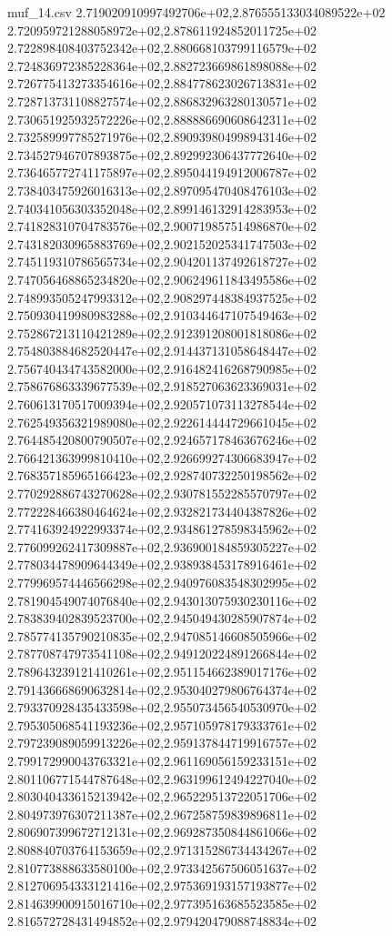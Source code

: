 \begin{filecontents*}{muf_14.csv}
2.719020910997492706e+02,2.876555133034089522e+02
2.720959721288058972e+02,2.878611924852011725e+02
2.722898408403752342e+02,2.880668103799116579e+02
2.724836972385228364e+02,2.882723669861898088e+02
2.726775413273354616e+02,2.884778623026713831e+02
2.728713731108827574e+02,2.886832963280130571e+02
2.730651925932572226e+02,2.888886690608642311e+02
2.732589997785271976e+02,2.890939804998943146e+02
2.734527946707893875e+02,2.892992306437772640e+02
2.736465772741175897e+02,2.895044194912006787e+02
2.738403475926016313e+02,2.897095470408476103e+02
2.740341056303352048e+02,2.899146132914283953e+02
2.741828310704783576e+02,2.900719857514986870e+02
2.743182030965883769e+02,2.902152025341747503e+02
2.745119310786565734e+02,2.904201137492618727e+02
2.747056468865234820e+02,2.906249611843495586e+02
2.748993505247993312e+02,2.908297448384937525e+02
2.750930419980983288e+02,2.910344647107549463e+02
2.752867213110421289e+02,2.912391208001818086e+02
2.754803884682520447e+02,2.914437131058648447e+02
2.756740434743582000e+02,2.916482416268790985e+02
2.758676863339677539e+02,2.918527063623369031e+02
2.760613170517009394e+02,2.920571073113278544e+02
2.762549356321989080e+02,2.922614444729661045e+02
2.764485420800790507e+02,2.924657178463676246e+02
2.766421363999810410e+02,2.926699274306683947e+02
2.768357185965166423e+02,2.928740732250198562e+02
2.770292886743270628e+02,2.930781552285570797e+02
2.772228466380464624e+02,2.932821734404387826e+02
2.774163924922993374e+02,2.934861278598345962e+02
2.776099262417309887e+02,2.936900184859305227e+02
2.778034478909644349e+02,2.938938453178916461e+02
2.779969574446566298e+02,2.940976083548302995e+02
2.781904549074076840e+02,2.943013075930230116e+02
2.783839402839523700e+02,2.945049430285907874e+02
2.785774135790210835e+02,2.947085146608505966e+02
2.787708747973541108e+02,2.949120224891266844e+02
2.789643239121410261e+02,2.951154662389017176e+02
2.791436668690632814e+02,2.953040279806764374e+02
2.793370928435433598e+02,2.955073456540530970e+02
2.795305068541193236e+02,2.957105978179333761e+02
2.797239089059913226e+02,2.959137844719916757e+02
2.799172990043763321e+02,2.961169056159233151e+02
2.801106771544787648e+02,2.963199612494227040e+02
2.803040433615213942e+02,2.965229513722051706e+02
2.804973976307211387e+02,2.967258759839896811e+02
2.806907399672712131e+02,2.969287350844861066e+02
2.808840703764153659e+02,2.971315286734434267e+02
2.810773888633580100e+02,2.973342567506051637e+02
2.812706954333121416e+02,2.975369193157193877e+02
2.814639900915016710e+02,2.977395163685523585e+02
2.816572728431494852e+02,2.979420479088748834e+02

\end{filecontents*}
